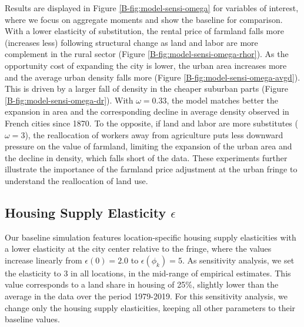 \documentclass[11pt]{report}
\begin{document}
Results are displayed in Figure \ref{B-fig:model-sensi-omega} for variables of interest, where we focus on aggregate moments and show the baseline for comparison. With a lower elasticity of substitution, the rental price of farmland falls more (increases less) following structural change as land and labor are more complement in the rural sector (Figure \ref{B-fig:model-sensi-omega-rhor}). As the opportunity cost of expanding the city is lower, the urban area increases more and the average urban density falls more (Figure \ref{B-fig:model-sensi-omega-avgd}). This is driven by a larger fall of density in the cheaper suburban parts (Figure \ref{B-fig:model-sensi-omega-dr}). With $\omega=0.33$, the model matches better the expansion in area and the corresponding decline in average density observed in French cities since 1870. To the opposite, if land and labor are more substitutes ($\omega=3$), the reallocation of workers away from agriculture puts less downward pressure on the value of farmland, limiting the expansion of the urban area and the decline in density, which falls short of the data. These experiments further illustrate the importance of the farmland price adjustment at the urban fringe to understand the reallocation of land use.



\subsection{Housing Supply Elasticity $\epsilon$}\label{B-sec:epsilon}


Our baseline simulation features location-specific housing supply elasticities with a lower elasticity at the city center relative to the fringe, where the values increase linearly from $\epsilon(0) = 2.0$ to $\epsilon(\phi_k) = 5$. As sensitivity analysis, we set the elasticity to 3 in all locations, in the mid-range of empirical estimates. This value corresponds to a land share in housing of 25\%, slightly lower than the average in the data over the period 1979-2019. For this sensitivity analysis, we change only the housing supply elasticities, keeping all other parameters to their baseline values.
\end{document}
